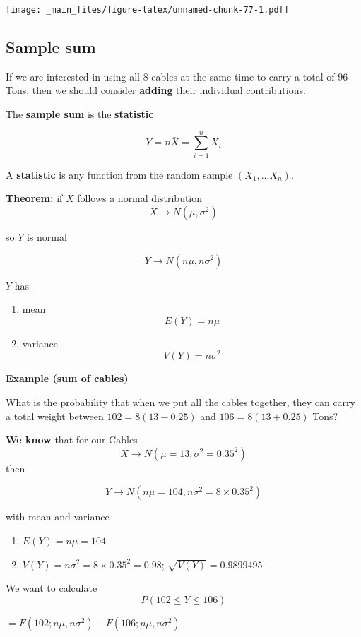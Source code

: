 \documentclass[
]{book}
\providecommand{\tightlist}{%
  \setlength{\itemsep}{0pt}\setlength{\parskip}{0pt}}
\begin{document}
\texttt{[image: \_main\_files/figure-latex/unnamed-chunk-77-1.pdf]}

\hypertarget{sample-sum}{%
\subsection{Sample sum}\label{sample-sum}}

If we are interested in using all \(8\) cables at the same time to carry a total of \(96\) Tons, then we should consider \textbf{adding} their individual contributions.

The \textbf{sample sum} is the \textbf{statistic}

\[Y=n \bar{X}=\sum_{i=1}^n X_i\]

A \textbf{statistic} is any function from the random sample \((X_1, ... X_n)\).

\textbf{Theorem:} if \(X\) follows a normal distribution
\[X \rightarrow N(\mu, \sigma^2)\]

so \(Y\) is normal

\[Y \rightarrow N(n\mu, n\sigma^2)\]

\(Y\) has

\begin{enumerate}
\def\labelenumi{\arabic{enumi})}
\tightlist
\item
  mean \[E(Y)=n\mu\]
\item
  variance \[V(Y)=n\sigma^2\]
\end{enumerate}

\textbf{Example (sum of cables)}

What is the probability that when we put all the cables together, they can carry a total weight between \(102=8(13 - 0.25)\) and \(106=8(13+ 0.25)\) Tons?

\textbf{We know} that for our Cables \[X \rightarrow N(\mu=13, \sigma^2=0.35^2)\] then

\[Y \rightarrow N(n\mu=104, n\sigma^2=8\times 0.35^2)\]

with mean and variance

\begin{enumerate}
\def\labelenumi{\arabic{enumi})}
\tightlist
\item
  \(E(Y)=n\mu=104\)
\item
  \(V(Y)=n\sigma^2=8\times 0.35^2=0.98\); \(\sqrt{V(Y)}=0.9899495\)
\end{enumerate}

We want to calculate \[P(102 \leq Y \leq 106)\]

\(=F(102; n\mu, n\sigma^2)-F(106; n\mu, n\sigma^2)\)
\end{document}
